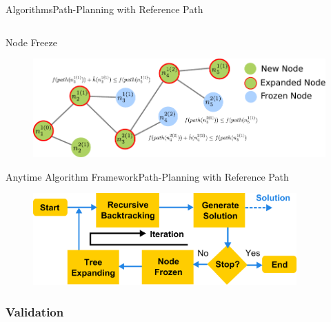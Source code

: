 \begin{frame}{Algorithms}{Path-Planning with Reference Path}
\begin{columns}
\end{columns}

\centering
\begin{minipage}{.6\textwidth}
\begin{block}{Node Freeze}
\begin{figure}
\centering
\includegraphics[width = \textwidth]{./figure/freeze_process}
\end{figure}
\end{block}
\end{minipage}

\end{frame}

\begin{frame}{Anytime Algorithm Framework}{Path-Planning with Reference Path}

\begin{figure}
\centering
\includegraphics[width = 0.9\textwidth]{./figure/alg_flow}
\end{figure}

\end{frame}

\subsubsection{Validation}

